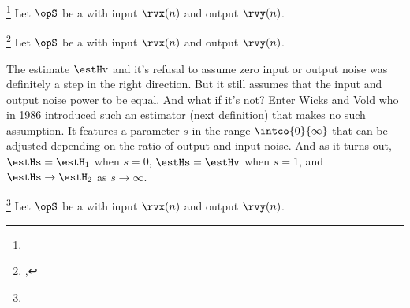\begin{definition}
\footnote{
  }
\label{def:Hharm}
Let $\opS$ be a  with input $\rvx(n)$ and output $\rvy(n)$.
\end{definition}

\begin{definition}
\footnote{
  ,
  }
\label{def:Hv}
Let $\opS$ be a  with input $\rvx(n)$ and output $\rvy(n)$.
\end{definition}

The estimate $\estHv$ and it's refusal to assume zero input or output noise 
was definitely a step in the right direction.
But it still assumes that the input and output noise power to be equal.
And what if it's not? 
Enter Wicks and Vold who in 1986 introduced such an estimator (next definition)
that makes no such assumption.
It features a parameter $s$ in the range $\intco{0}{\infty}$
that can be adjusted depending on the ratio of output and input noise.
And as it turns out, $\estHs = \estH_1$ when $s=0$, $\estHs=\estHv$ when $s=1$, and 
$\estHs\to\estH_2$ as $s\to\infty$. %
\begin{definition}
\footnote{
  }
\label{def:Hs}
Let $\opS$ be a  with input $\rvx(n)$ and output $\rvy(n)$.
\end{definition}

